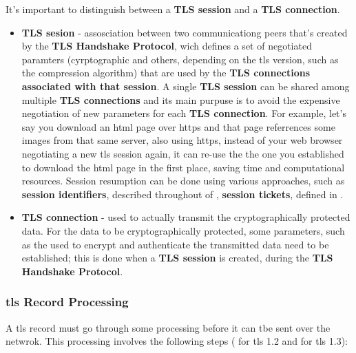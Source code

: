 \documentclass{llncs}
\begin{document}
It's important to distinguish between a \textbf{TLS session} and a \textbf{TLS connection}.
\begin{itemize}
  \item \textbf{TLS sesion} - assosciation between two communicationg peers that's
  created by the \textbf{TLS Handshake Protocol}, wich defines a set of negotiated paramters
  (cyrptographic and others, depending on the \gls{tls} version, such as
  the compression algorithm) that are used by the \textbf{TLS connections associated
  with that session}. A single \textbf{TLS session} can be shared among multiple
  \textbf{TLS connections} and its main purpuse is to avoid the expensive negotiation
  of new parameters for each \textbf{TLS connection}. For example, let's say
  you download an \gls{html} page over \gls{https} and that page referrences
  some images from that same server, also using \gls{https}, instead of your
  web browser negotiating a new \gls{tls} session again, it can re-use the the
  one you established to download the \gls{html} page in the first place,
  saving time and computational resources. Session resumption can be done using various
  approaches, such as \textbf{session identifiers}, described throughout 
  of  \cite{RFC5246}, \textbf{session tickets}, defined in
   \cite{RFC5077}.
  \item \textbf{TLS connection} - used to actually transmit the cryptographically
  protected data. For the data to be cryptographically protected, some parameters,
  such as the  used to encrypt and authenticate the transmitted
  data need to be established; this is done when a \textbf{TLS session} is created,
  during the \textbf{TLS Handshake Protocol}.
\end{itemize}

\subsubsection{\gls{tls} Record Processing}
A \gls{tls} record must go through some processing before it can tbe sent over the netwrok.
This processing involves the following steps ( for \gls{tls} 1.2 and  for \gls{tls} 1.3):
\end{document}
